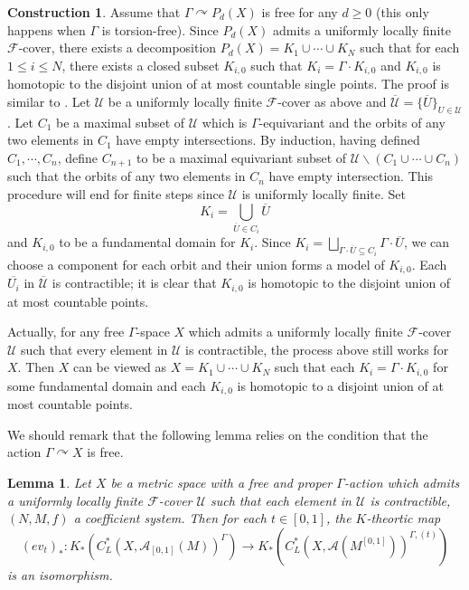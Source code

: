 \documentclass[11pt]{article}
\theoremstyle{definition}
\newtheorem{Cons}[Def]{Construction}
\theoremstyle{plain}
\newtheorem{Lem}[Def]{Lemma}
\def\A{\mathcal A}\def\C{\mathcal C}\def\B{\mathcal B}\def\E{\mathcal E}\def\O{\mathcal O}\def\h{\mathfrak h}\def\K{\mathcal K}\def\F{\mathcal F}\def\P{\mathcal P}\def\L{\mathcal L}\def\R{\mathcal R}\def\Q{\mathcal Q}\def\H{\mathcal H}\def\S{\mathcal S}\def\N{\mathcal N}\def\U{\mathcal U}\def\V{\mathcal V}
\def\Ga{\Gamma}
\def\car{\curvearrowright}
\begin{document}
\begin{Cons}\label{finite pieces}
Assume that $\Ga\car P_d(X)$ is free for any $d\geq 0$ (this only happens when $\Ga$ is torsion-free). Since $P_d(X)$ admits a uniformly locally finite $\F$-cover, there exists a decomposition $P_d(X)=K_1\cup \cdots\cup K_N$ such that for each $1\leq i\leq N$, there exists a closed subset $K_{i,0}$ such that $K_i=\Ga\cdot K_{i,0}$ and $K_{i,0}$ is homotopic to the disjoint union of at most countable single points. The proof is similar to \cite[Lemma 12.2.3]{HIT2020}. Let $\U$ be a uniformly locally finite $\F$-cover as above and $\overline{\U}=\{\overline{U}\}_{U\in\U}$. Let $C_1$ be a maximal subset of $\U$ which is $\Ga$-equivariant and the orbits of any two elements in $C_1$ have empty intersections. By induction, having defined $C_1,\cdots, C_n$, define $C_{n+1}$ to be a maximal equivariant subset of $\U\backslash(C_1\cup\cdots\cup C_n)$ such that the orbits of any two elements in $C_n$ have empty intersection. This procedure will end for finite steps since $\U$ is uniformly locally finite. Set
$$K_i=\bigcup_{\overline{U}\in C_i}\overline{U}$$
and $K_{i,0}$ to be a fundamental domain for $K_i$. Since $K_i=\bigsqcup_{\Ga\cdot\overline{U}\subseteq C_i} \Ga\cdot\overline{U}$, we can choose a component for each orbit and their union forms a model of $K_{i,0}$. Each $\overline{U_i}$ in $\overline{\U}$ is contractible; it is clear that $K_{i,0}$ is homotopic to the disjoint union of at most countable points.

Actually, for any free $\Ga$-space $X$ which admits a uniformly locally finite $\F$-cover $\U$ such that every element in $\U$ is contractible, the process above still works for $X$. Then $X$ can be viewed as $X=K_1\cup\cdots\cup K_N$ such that each $K_i=\Ga\cdot K_{i,0}$ for some fundamental domain and each $K_{i,0}$ is homotopic to a disjoint union of at most countable points.
\end{Cons}

We should remark that the following lemma relies on the condition that the action $\Ga\car X$ is free.

\begin{Lem}\label{deformation}
Let $X$ be a metric space with a \emph{free} and proper $\Ga$-action which admits a uniformly locally finite $\F$-cover $\U$ such that each element in $\U$ is contractible, $(N,M,f)$ a coefficient system. Then for each $t\in[0,1]$, the $K$-theortic map
$$(ev_t)_*:K_*(C^*_L(X,\A_{[0,1]}(M))^{\Ga})\to K_*(C^*_L(X,\A(M^{[0,1]}))^{\Ga,(t)})$$
is an isomorphism.
\end{Lem}
\end{document}

